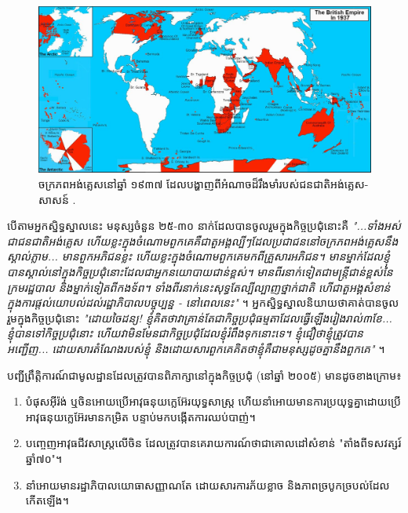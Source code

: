 \documentclass[10pt,twocolumn,letterpaper]{article}
\begin{document}
\begin{figure}[t]
\begin{center}
\includegraphics[width=1\textwidth]{british.jpg}
\end{center}
   \caption{ចក្រភពអង់គ្លេសនៅឆ្នាំ ១៩៣៧ ដែលបង្ហាញពីអំណាចដ៏រឹងមាំរបស់ជនជាតិអង់គ្លេស-សាសន៍ \cite{14}.}
   \label{fig:2}
\end{figure}
បើតាមអ្នកស្និទ្ធស្នាលនេះ មនុស្សចំនួន ២៥-៣០ នាក់ដែលបានចូលរួមក្នុងកិច្ចប្រជុំនោះគឺ \textit{"...ទាំងអស់ជាជនជាតិអង់គ្លេស ហើយខ្លះក្នុងចំណោមពួកគេគឺជាតួអង្គល្បីៗដែលប្រជាជននៅចក្រភពអង់គ្លេសនឹងស្គាល់ភ្លាម... មានពួកអភិជនខ្លះ ហើយខ្លះក្នុងចំណោមពួកគេមកពីគ្រួសារអភិជន។ មានម្នាក់ដែលខ្ញុំបានស្គាល់នៅក្នុងកិច្ចប្រជុំនោះដែលជាអ្នកនយោបាយជាន់ខ្ពស់។ មានពីរនាក់ទៀតជាមន្ត្រីជាន់ខ្ពស់នៃក្រមរដ្ឋបាល និងម្នាក់ទៀតពីកងទ័ព។ ទាំងពីរនាក់នេះសុទ្ធតែល្បីល្បាញថ្នាក់ជាតិ ហើជាតួអង្គសំខាន់ក្នុងការផ្តល់យោបល់ដល់រដ្ឋាភិបាលបច្ចុប្បន្ន - នៅពេលនេះ"} \cite{4}។ អ្នកស្និទ្ធស្នាលនិយាយថាគាត់បានចូលរួមក្នុងកិច្ចប្រជុំនោះ \textit{"ដោយចៃដន្យ! ខ្ញុំគិតថាវាគ្រាន់តែជាកិច្ចប្រជុំធម្មតាដែលធ្វើឡើងរៀងរាល់៣ខែ... ខ្ញុំបានទៅកិច្ចប្រជុំនោះ ហើយវាមិនមែនជាកិច្ចប្រជុំដែលខ្ញុំរំពឹងទុកនោះទេ។ ខ្ញុំជឿថាខ្ញុំត្រូវបានអញ្ជើញ... ដោយសារតំណែងរបស់ខ្ញុំ និងដោយសារពួកគេគិតថាខ្ញុំគឺជាមនុស្សដូចគ្នានឹងពួកគេ"} \cite{4}។

បញ្ជីព្រឹត្តិការណ៍ជាមូលដ្ឋានដែលត្រូវបានពិភាក្សានៅក្នុងកិច្ចប្រជុំ (នៅឆ្នាំ ២០០៥) មានដូចខាងក្រោម៖

\begin{flushleft}
\begin{enumerate}
    \item បំផុសអ៊ីរ៉ង់ ឬចិនអោយប្រើអាវុធនុយក្លេអ៊ែរយុទ្ធសាស្ត្រ ហើយនាំអោយមានការប្រយុទ្ធគ្នាដោយប្រើអាវុធនុយក្លេអ៊ែរមានកម្រិត បន្ទាប់មកបង្កើតការឈប់បាញ់។
    \item បញ្ចេញអាវុធជីវសាស្ត្រលើចិន ដែលត្រូវបានគេរាយការណ៍ថាជាគោលដៅសំខាន់ "តាំងពីទសវត្សរ៍ឆ្នាំ៧០"។
    \item នាំអោយមានរដ្ឋាភិបាលយោធាសញ្ញាណតែ ដោយសារការភ័យខ្លាច និងភាពច្របូកច្របល់ដែលកើតឡើង។
\end{enumerate}
\end{flushleft}
\end{document}
